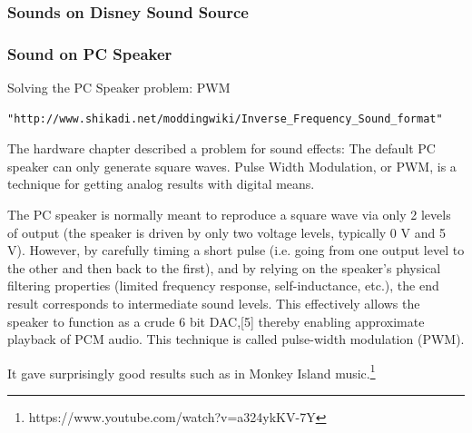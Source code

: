\subsubsection{Sounds on Disney Sound Source}



\subsubsection{Sound on PC Speaker}
Solving the PC Speaker problem: PWM\\
\par
\begin{verbatim}
"http://www.shikadi.net/moddingwiki/Inverse_Frequency_Sound_format"
\end{verbatim}
The hardware chapter described a problem for sound effects: The default PC speaker can only generate square waves. Pulse Width Modulation, or PWM, is a technique for getting analog results with digital means.




\par
 \begin{fancyquotes}
  The PC speaker is normally meant to reproduce a square wave via only 2 levels of output (the speaker is driven by only two voltage levels, typically 0 V and 5 V). However, by carefully timing a short pulse (i.e. going from one output level to the other and then back to the first), and by relying on the speaker's physical filtering properties (limited frequency response, self-inductance, etc.), the end result corresponds to intermediate sound levels. This effectively allows the speaker to function as a crude 6 bit DAC,[5] thereby enabling approximate playback of PCM audio. This technique is called pulse-width modulation (PWM).
 \end{fancyquotes}
\par
  It gave surprisingly good results such as in Monkey Island music.\footnote{https://www.youtube.com/watch?v=a324ykKV-7Y}

